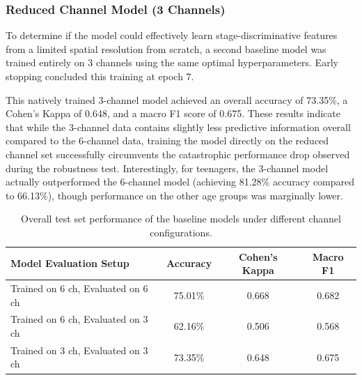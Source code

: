 \subsubsection*{Reduced Channel Model (3 Channels)}
To determine if the model could effectively learn stage-discriminative features from a limited spatial resolution from scratch, a second baseline model was trained entirely on 3 channels using the same optimal hyperparameters. Early stopping concluded this training at epoch 7.

This natively trained 3-channel model achieved an overall accuracy of 73.35\%, a Cohen's Kappa of 0.648, and a macro F1 score of 0.675. These results indicate that while the 3-channel data contains slightly less predictive information overall compared to the 6-channel data, training the model directly on the reduced channel set successfully circumvents the catastrophic performance drop observed during the robustness test. Interestingly, for teenagers, the 3-channel model actually outperformed the 6-channel model (achieving 81.28\% accuracy compared to 66.13\%), though performance on the other age groups was marginally lower.

\begin{table}[ht]
\centering
\caption{Overall test set performance of the baseline models under different channel configurations.}
\label{tab:overall_results}
\begin{tabular}{l c c c}
\toprule
\textbf{Model Evaluation Setup} & \textbf{Accuracy} & \textbf{Cohen's Kappa} & \textbf{Macro F1} \\
\midrule
Trained on 6 ch, Evaluated on 6 ch & 75.01\% & 0.668 & 0.682 \\
Trained on 6 ch, Evaluated on 3 ch & 62.16\% & 0.506 & 0.568 \\
Trained on 3 ch, Evaluated on 3 ch & 73.35\% & 0.648 & 0.675 \\
\bottomrule
\end{tabular}
\end{table}

